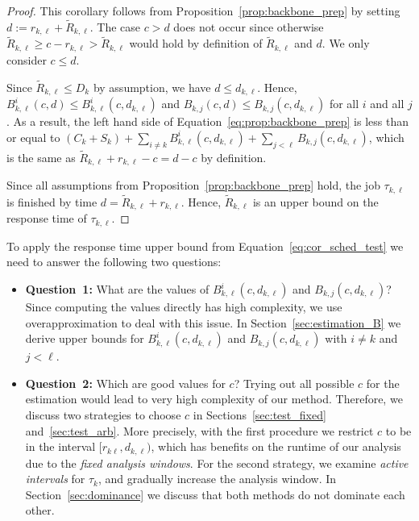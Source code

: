 \documentclass[conference]{IEEEtran}
\theoremstyle{definition}
\theoremstyle{remark}
\newcommand{\Rtilde}{\widetilde{R}}
\begin{document}
	\begin{proof}
		This corollary follows from Proposition~\ref{prop:backbone_prep} by setting $d:=r_{k,\ell} + \Rtilde_{k,\ell}$.
		The case $c>d$ does not occur since otherwise $\Rtilde_{k,\ell} \geq  c-r_{k,\ell} > \Rtilde_{k,\ell}$ would hold by definition of $\Rtilde_{k,\ell}$ and $d$.
		We only consider $c \leq d$.
		
		Since $\Rtilde_{k,\ell} \leq D_k$ by assumption, we have $d\leq d_{k,\ell}$.
		Hence, $B^i_{k,\ell}(c,d)\leq B^i_{k,\ell}(c,d_{k,\ell})$ and $B_{k,j}(c,d) \leq B_{k,j}(c,d_{k,\ell})$ for all $i$ and all $j$.
		As a result, the left hand side of Equation~\eqref{eq:prop:backbone_prep} is less than or equal to $(C_k+ S_k) + \sum_{i \neq k} B^i_{k,\ell}(c,d_{k,\ell}) + \sum_{j < \ell} B_{k,j}(c,d_{k,\ell})$, which is the same as $\Rtilde_{k,\ell} + r_{k,\ell} - c = d-c$ by definition.
		
		Since all assumptions from Proposition~\ref{prop:backbone_prep} hold, the job $\tau_{k,\ell}$ is finished by time $d=\Rtilde_{k,\ell} + r_{k,\ell}$.
		Hence, $\Rtilde_{k,\ell}$ is an upper bound on the response time of $\tau_{k,\ell}$.
	\end{proof}

	To apply the response time upper bound from Equation~\eqref{eq:cor_sched_test} we need to answer the following two questions:
	\begin{itemize}
		\item \textbf{Question~1:} What are the values of $B^i_{k,\ell}(c,d_{k,\ell})$ and $B_{k,j}(c,d_{k,\ell})$?
		Since computing the values directly has high complexity, we use overapproximation to deal with this issue.
		In Section~\ref{sec:estimation_B} we derive upper bounds for $B^i_{k,\ell}(c,d_{k,\ell})$ and $B_{k,j}(c,d_{k,\ell})$ with $i\neq k$ and $j<\ell$.
		\item \textbf{Question~2:} Which are good values for $c$?
		Trying out all possible $c$ for the estimation would lead to very high complexity of our method.
		Therefore, we discuss two strategies to choose $c$ in Sections~\ref{sec:test_fixed} and~\ref{sec:test_arb}.
		More precisely, with the first procedure we restrict $c$ to be in the interval $[r_{k\ell}, d_{k,\ell})$, which has benefits on the runtime of our analysis due to the \emph{fixed analysis windows}.
		For the second strategy, we examine \emph{active intervals} for $\tau_k$, and gradually increase the analysis window.
		In Section~\ref{sec:dominance} we discuss that both methods do not dominate each other.
	\end{itemize}
	
\end{document}
